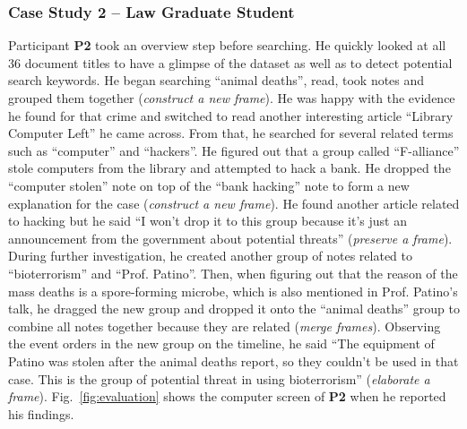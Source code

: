 \subsubsection{Case Study 2 -- Law Graduate Student}
Participant \textbf{P2} took an overview step before searching. He quickly looked at all 36 document titles to have a glimpse of the dataset as well as to detect potential search keywords. He began searching ``animal deaths'', read, took notes and grouped them together (\textit{construct a new frame}). He was happy with the evidence he found for that crime and switched to read another interesting article ``Library Computer Left'' he came across. From that, he searched for several related terms such as ``computer'' and ``hackers''. He figured out that a group called ``F-alliance'' stole computers from the library and attempted to hack a bank. He dropped the ``computer stolen'' note on top of the ``bank hacking'' note to form a new explanation for the case (\textit{construct a new frame}). He found another article related to hacking but he said ``I won't drop it to this group because it's just an announcement from the government about potential threats'' (\textit{preserve a frame}). During further investigation, he created another group of notes related to ``bioterrorism'' and ``Prof. Patino''. Then, when figuring out that the reason of the mass deaths is a spore-forming microbe, which is also mentioned in Prof. Patino's talk, he dragged the new group and dropped it onto the ``animal deaths'' group to combine all notes together because they are related (\textit{merge frames}). Observing the event orders in the new group on the timeline, he said ``The equipment of Patino was stolen after the animal deaths report, so they couldn't be used in that case. This is the group of potential threat in using bioterrorism'' (\textit{elaborate a frame}). Fig.~\ref{fig:evaluation} shows the computer screen of \textbf{P2} when he reported his findings.

